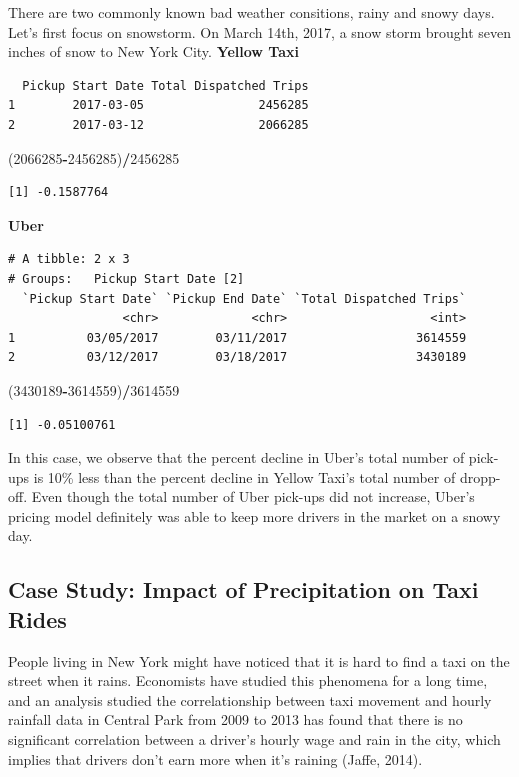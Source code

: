 \documentclass[12pt,twoside]{reedthesis}
\newenvironment{Shaded}{\begin{snugshade}}{\end{snugshade}}
\newcommand{\DecValTok}[1]{\textcolor[rgb]{0.00,0.00,0.81}{#1}}
\newcommand{\OperatorTok}[1]{\textcolor[rgb]{0.81,0.36,0.00}{\textbf{#1}}}
\newcommand{\NormalTok}[1]{#1}
\theoremstyle{definition}
\theoremstyle{definition}
\theoremstyle{definition}
\theoremstyle{remark}
\begin{document}
There are two commonly known bad weather consitions, rainy and snowy
days. Let's first focus on snowstorm. On March 14th, 2017, a snow storm
brought seven inches of snow to New York City. \textbf{Yellow Taxi}
\begin{verbatim}
  Pickup Start Date Total Dispatched Trips
1        2017-03-05                2456285
2        2017-03-12                2066285
\end{verbatim}
\begin{Shaded}
\begin{Highlighting}[]
\NormalTok{(}\DecValTok{2066285}\OperatorTok{-}\DecValTok{2456285}\NormalTok{)}\OperatorTok{/}\DecValTok{2456285}
\end{Highlighting}
\end{Shaded}
\begin{verbatim}
[1] -0.1587764
\end{verbatim}
\textbf{Uber}
\begin{verbatim}
# A tibble: 2 x 3
# Groups:   Pickup Start Date [2]
  `Pickup Start Date` `Pickup End Date` `Total Dispatched Trips`
                <chr>             <chr>                    <int>
1          03/05/2017        03/11/2017                  3614559
2          03/12/2017        03/18/2017                  3430189
\end{verbatim}
\begin{Shaded}
\begin{Highlighting}[]
\NormalTok{(}\DecValTok{3430189}\OperatorTok{-}\DecValTok{3614559}\NormalTok{)}\OperatorTok{/}\DecValTok{3614559}
\end{Highlighting}
\end{Shaded}
\begin{verbatim}
[1] -0.05100761
\end{verbatim}
In this case, we observe that the percent decline in Uber's total number
of pick-ups is 10\% less than the percent decline in Yellow Taxi's total
number of dropp-off. Even though the total number of Uber pick-ups did
not increase, Uber's pricing model definitely was able to keep more
drivers in the market on a snowy day.

\subsection{Case Study: Impact of Precipitation on Taxi
Rides}\label{case-study-impact-of-precipitation-on-taxi-rides}

People living in New York might have noticed that it is hard to find a
taxi on the street when it rains. Economists have studied this phenomena
for a long time, and an analysis studied the correlationship between
taxi movement and hourly rainfall data in Central Park from 2009 to 2013
has found that there is no significant correlation between a driver's
hourly wage and rain in the city, which implies that drivers don't earn
more when it's raining (Jaffe, 2014).
\end{document}
